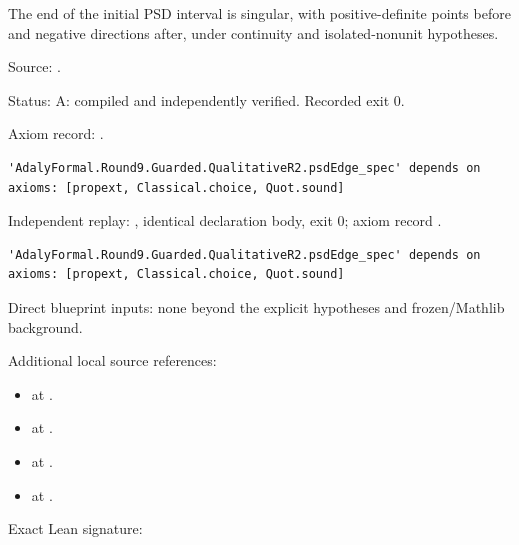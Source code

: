 \begin{theorem}[bp-110]
\label{bp-110}
\uses{}
\leanok
The end of the initial PSD interval is singular, with positive-definite points before and negative directions after, under continuity and isolated-nonunit hypotheses.

\par Source: \texttt{}.
\par Status: A: compiled and independently verified. Recorded exit 0.
\par Axiom record: \texttt{}.
\begin{verbatim}
'AdalyFormal.Round9.Guarded.QualitativeR2.psdEdge_spec' depends on axioms: [propext, Classical.choice, Quot.sound]
\end{verbatim}
\par Independent replay: \texttt{}, identical declaration body, exit 0; axiom record \texttt{}.
\begin{verbatim}
'AdalyFormal.Round9.Guarded.QualitativeR2.psdEdge_spec' depends on axioms: [propext, Classical.choice, Quot.sound]
\end{verbatim}
\par Direct blueprint inputs: none beyond the explicit hypotheses and frozen/Mathlib background.
\par Additional local source references:
\begin{itemize}
\item \texttt{} at \texttt{}.
\item \texttt{} at \texttt{}.
\item \texttt{} at \texttt{}.
\item \texttt{} at \texttt{}.
\end{itemize}
\par Exact Lean signature:

\end{theorem}
